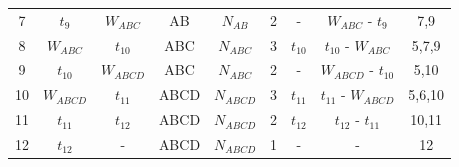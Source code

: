 \documentclass[11pt]{article}
\begin{document}
\begin{table}[t]
\begin{tabular}[t]{ |c|c|c|c|c|c|c|c|c| }
	7 & $t_9$      & $W_{ABC}$  & AB  & $N_{AB}$  & 2 & -        & $W_{ABC}$ - $t_9$    & 7,9   \\
	8 & $W_{ABC}$  & $t_{10}$   & ABC & $N_{ABC}$ & 3 & $t_{10}$ & $t_{10}$ - $W_{ABC}$ & 5,7,9  \\
	9 & $t_{10}$   & $W_{ABCD}$ & ABC & $N_{ABC}$ & 2 & -        & $W_{ABCD}$ - $t_{10}$ & 5,10 \\
	10 & $W_{ABCD}$ & $t_{11}$  & ABCD & $N_{ABCD}$ & 3 & $t_{11}$ & $t_{11}$ - $W_{ABCD}$ & 5,6,10 \\
	11 & $t_{11}$  & $t_{12}$   & ABCD & $N_{ABCD}$ & 2 & $t_{12}$ & $t_{12}$ - $t_{11}$ & 10,11 \\
	12 & $t_{12}$  & -          & ABCD & $N_{ABCD}$ & 1 & -        & -                   & 12    \\	
	\bottomrule
\end{tabular}
\label{tab:table-1} 
\end{table}
\end{document}
